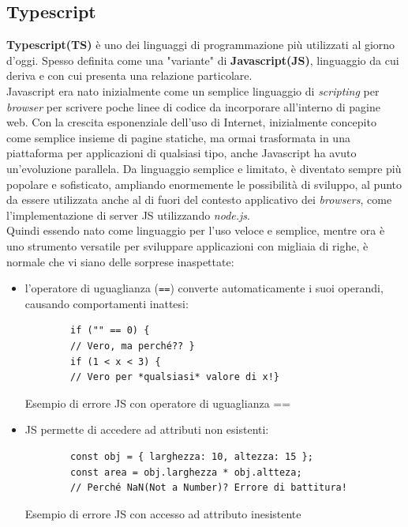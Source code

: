 \subsection{Typescript}
\textbf{Typescript(TS)} è uno dei linguaggi di programmazione più utilizzati al giorno d'oggi. Spesso definita come una "variante" di \textbf{Javascript(JS)}, linguaggio da cui deriva e con cui presenta una relazione particolare.\\
Javascript era nato inizialmente come un semplice linguaggio di \textit{scripting} per \textit{browser} per scrivere poche linee di codice da incorporare all'interno di pagine web. Con la crescita esponenziale dell'uso di Internet, inizialmente concepito come semplice insieme di pagine statiche, ma ormai trasformata in una piattaforma per applicazioni di qualsiasi tipo, anche Javascript ha avuto un'evoluzione parallela. Da linguaggio semplice e limitato, è diventato sempre più popolare e sofisticato, ampliando enormemente le possibilità di sviluppo, al punto da essere utilizzata anche al di fuori del contesto applicativo dei \textit{browsers}, come l'implementazione di server JS utilizzando \textit{node.js}.\\
Quindi essendo nato come linguaggio per l'uso veloce e semplice, mentre ora è uno strumento versatile per sviluppare applicazioni con migliaia di righe, è normale che vi siano delle sorprese inaspettate:
\begin{itemize}
    \item l'operatore di uguaglianza (\verb|==|) converte automaticamente i suoi operandi, causando comportamenti inattesi:
    \begin{listing}[H]
        \begin{verbatim}
        if ("" == 0) {
        // Vero, ma perché?? }
        if (1 < x < 3) {
        // Vero per *qualsiasi* valore di x!}
        \end{verbatim}
        \caption{Esempio di errore JS con operatore di uguaglianza ==}
        \label{listing:js-error-1}
    \end{listing}
    \item JS permette di accedere ad attributi non esistenti:
    \begin{listing}[H]
        \begin{verbatim}
        const obj = { larghezza: 10, altezza: 15 };
        const area = obj.larghezza * obj.altteza;
        // Perché NaN(Not a Number)? Errore di battitura!
        \end{verbatim}
        \caption{Esempio di errore JS con accesso ad attributo inesistente}
        \label{listing:js-error-2}
    \end{listing}
\end{itemize}

